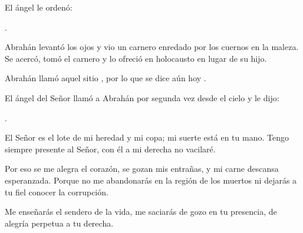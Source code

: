 \begin{scripture}
El ángel le ordenó: 

.

Abrahán levantó los ojos y vio un carnero enredado por los cuernos en la maleza. Se acercó, tomó el carnero y lo ofreció en holocausto en lugar de su hijo. 

Abrahán llamó aquel sitio , por lo que se dice aún hoy . 

El ángel del Señor llamó a Abrahán por segunda vez desde el cielo y le dijo: 

.
\end{scripture}

\newpage 


 


\begin{psbody}
El Señor es el lote de mi heredad y mi copa; 
mi suerte está en tu mano. 
Tengo siempre presente al Señor, 
con él a mi derecha no vacilaré. 

Por eso se me alegra el corazón, 
se gozan mis entrañas, 
y mi carne descansa esperanzada. 
Porque no me abandonarás en la región de los muertos 
ni dejarás a tu fiel conocer la corrupción. 

Me enseñarás el sendero de la vida, 
me saciarás de gozo en tu presencia, 
de alegría perpetua a tu derecha. 
\end{psbody}


 


